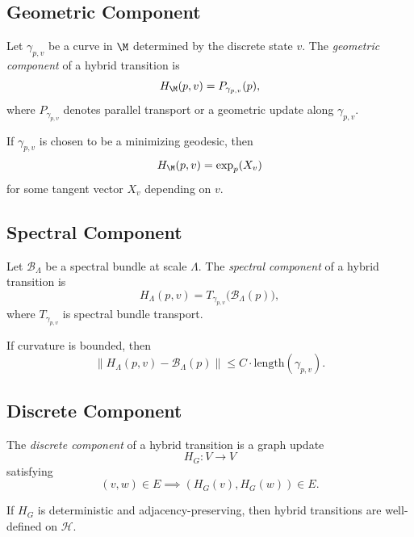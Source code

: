 \subsection{Geometric Component}

\begin{definition}
Let $\gamma_{p,v}$ be a curve in $\M$ determined by the discrete state $v$.
The \emph{geometric component} of a hybrid transition is
\[
H_\M(p,v) = P_{\gamma_{p,v}}(p),
\]
where $P_{\gamma_{p,v}}$ denotes parallel transport or a geometric update
along $\gamma_{p,v}$.
\end{definition}

\begin{lemma}
If $\gamma_{p,v}$ is chosen to be a minimizing geodesic, then
\[
H_\M(p,v) = \exp_p(X_v)
\]
for some tangent vector $X_v$ depending on $v$.
\end{lemma}

\subsection{Spectral Component}

\begin{definition}
Let $\mathcal{B}_\Lambda$ be a spectral bundle at scale $\Lambda$.  
The \emph{spectral component} of a hybrid transition is
\[
H_\Lambda(p,v)
= T_{\gamma_{p,v}} \big( \mathcal{B}_\Lambda(p) \big),
\]
where $T_{\gamma_{p,v}}$ is spectral bundle transport.
\end{definition}

\begin{lemma}
If curvature is bounded, then
\[
\| H_\Lambda(p,v) - \mathcal{B}_\Lambda(p) \|
\le C \cdot \mathrm{length}(\gamma_{p,v}).
\]
\end{lemma}

\subsection{Discrete Component}

\begin{definition}
The \emph{discrete component} of a hybrid transition is a graph update
\[
H_G : V \to V
\]
satisfying
\[
(v,w) \in E \implies (H_G(v), H_G(w)) \in E.
\]
\end{definition}

\begin{lemma}
If $H_G$ is deterministic and adjacency-preserving, then hybrid transitions
are well-defined on $\mathcal{H}$.
\end{lemma}

